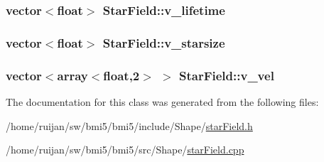 \hypertarget{classStarField_a3090733382397dd067da0f60d26085c0}{
\subsubsection[{v\-\_\-lifetime}]{\setlength{\rightskip}{0pt plus 5cm}vector$<$float$>$ Star\-Field\-::v\-\_\-lifetime}}\label{classStarField_a3090733382397dd067da0f60d26085c0}
\hypertarget{classStarField_ac66cfbc7ac7d40cd1c7f0b7bf6b5dd1a}{
\subsubsection[{v\-\_\-starsize}]{\setlength{\rightskip}{0pt plus 5cm}vector$<$float$>$ Star\-Field\-::v\-\_\-starsize}}\label{classStarField_ac66cfbc7ac7d40cd1c7f0b7bf6b5dd1a}
\hypertarget{classStarField_a28482b3624fa5204a35faf1dbca6136c}{
\subsubsection[{v\-\_\-vel}]{\setlength{\rightskip}{0pt plus 5cm}vector$<$array$<$float,2$>$ $>$ Star\-Field\-::v\-\_\-vel}}\label{classStarField_a28482b3624fa5204a35faf1dbca6136c}


The documentation for this class was generated from the following files\-:\begin{DoxyCompactItemize}
\item 
/home/ruijan/sw/bmi5/bmi5/include/\-Shape/\hyperlink{starField_8h}{star\-Field.\-h}\item 
/home/ruijan/sw/bmi5/bmi5/src/\-Shape/\hyperlink{starField_8cpp}{star\-Field.\-cpp}\end{DoxyCompactItemize}
